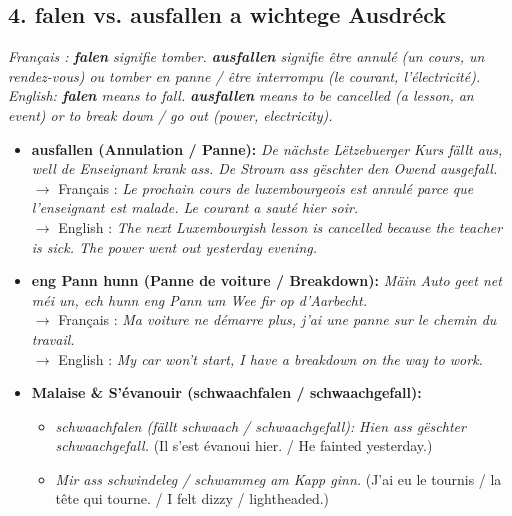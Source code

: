 \subsection*{4. falen vs. ausfallen a wichtege Ausdréck}

\noindent\textit{Français : \textbf{falen} signifie tomber. \textbf{ausfallen} signifie être annulé (un cours, un rendez-vous) ou tomber en panne / être interrompu (le courant, l'électricité).}\\
\textit{English: \textbf{falen} means to fall. \textbf{ausfallen} means to be cancelled (a lesson, an event) or to break down / go out (power, electricity).}

\begin{itemize}
    \item \textbf{ausfallen (Annulation / Panne):} \textit{De nächste Lëtzebuerger Kurs fällt aus, well de Enseignant krank ass. De Stroum ass gëschter den Owend ausgefall.}\\
    $\rightarrow$ Français : \textit{Le prochain cours de luxembourgeois est annulé parce que l'enseignant est malade. Le courant a sauté hier soir.}\\
    $\rightarrow$ English : \textit{The next Luxembourgish lesson is cancelled because the teacher is sick. The power went out yesterday evening.}
    
    \item \textbf{eng Pann hunn (Panne de voiture / Breakdown):} \textit{Mäin Auto geet net méi un, ech hunn eng Pann um Wee fir op d'Aarbecht.}\\
    $\rightarrow$ Français : \textit{Ma voiture ne démarre plus, j'ai une panne sur le chemin du travail.}\\
    $\rightarrow$ English : \textit{My car won't start, I have a breakdown on the way to work.}
    
    \item \textbf{Malaise \& S'évanouir (schwaachfalen / schwaachgefall):}
    \begin{itemize}
        \item \textit{schwaachfalen (fällt schwaach / schwaachgefall):} \textit{Hien ass gëschter schwaachgefall.} (Il s'est évanoui hier. / He fainted yesterday.)
        \item \textit{Mir ass schwindeleg / schwammeg am Kapp ginn.} (J'ai eu le tournis / la tête qui tourne. / I felt dizzy / lightheaded.)
    \end{itemize}
    

\end{itemize}
